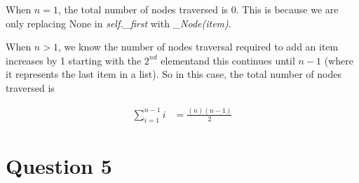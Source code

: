 \documentclass[12pt]{article}
\begin{document}
\begin{enumerate}[a.]
\begin{mdframed}
        \bigskip

        When $n = 1$, the total number of nodes traversed is 0. This is because
        we are only replacing None in \textit{self.\_first} with \textit{\_Node(item)}.

        \bigskip

        When \color{red}$n > 1$, we know the number of nodes traversal
        required to add an item increases by 1 starting with the $2^{nd}$
        element\color{black}\:and this continues until $n - 1$ (where it represents
        the last item in a list). So in this case, the total number of nodes traversed is

        \begin{align}
            \sum\limits_{i=1}^{n-1} i &= \frac{(n)(n-1)}{2}
        \end{align}
    \end{mdframed}

\end{enumerate}

\section*{Question 5}
\end{document}
